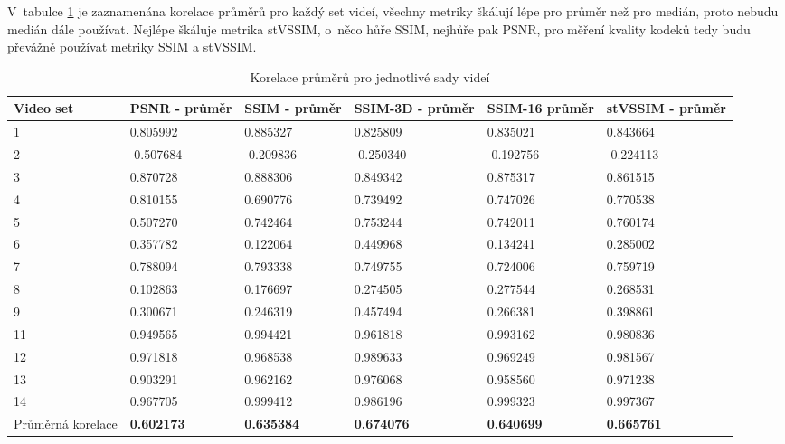 \documentclass[thesis=M,czech]{FITthesis}[2016/06/26]
\begin{document}
V~tabulce \ref{tab:korelace_avg} je zaznamenána korelace průměrů pro každý set videí, všechny metriky škálují lépe pro průměr než pro medián, proto nebudu medián dále používat. Nejlépe škáluje metrika stVSSIM, o~něco hůře SSIM, nejhůře pak PSNR, pro měření kvality kodeků tedy budu převážně používat metriky SSIM a stVSSIM.
\begin{table}[]
\centering
\begin{tabular}{|p{1.5cm}|p{1.8cm}|p{1.8cm}|p{1.9cm}|p{1.9cm}|p{1.9cm}|}
\hline
Video set         & PSNR - průměr & SSIM - průměr & SSIM-3D - průměr & SSIM-16 průměr & stVSSIM - průměr \\ \hline
1                 & 0.805992      & 0.885327      & 0.825809         & 0.835021       & 0.843664         \\ \hline
2                 & -0.507684     & -0.209836     & -0.250340        & -0.192756      & -0.224113        \\ \hline
3                 & 0.870728      & 0.888306      & 0.849342         & 0.875317       & 0.861515         \\ \hline
4                 & 0.810155      & 0.690776      & 0.739492         & 0.747026       & 0.770538         \\ \hline
5                 & 0.507270      & 0.742464      & 0.753244         & 0.742011       & 0.760174         \\ \hline
6                 & 0.357782      & 0.122064      & 0.449968         & 0.134241       & 0.285002         \\ \hline
7                 & 0.788094      & 0.793338      & 0.749755         & 0.724006       & 0.759719         \\ \hline
8                 & 0.102863      & 0.176697      & 0.274505         & 0.277544       & 0.268531         \\ \hline
9                 & 0.300671      & 0.246319      & 0.457494         & 0.266381       & 0.398861         \\ \hline
11                & 0.949565      & 0.994421      & 0.961818         & 0.993162       & 0.980836         \\ \hline
12                & 0.971818      & 0.968538      & 0.989633         & 0.969249       & 0.981567         \\ \hline
13                & 0.903291      & 0.962162      & 0.976068         & 0.958560       & 0.971238         \\ \hline
14                & 0.967705      & 0.999412      & 0.986196         & 0.999323       & 0.997367         \\ \hline
Průměrná korelace & \textbf{0.602173}      & \textbf{0.635384}      & \textbf{0.674076}         & \textbf{0.640699}       & \textbf{0.665761}         \\ \hline
\end{tabular}
\caption{Korelace průměrů pro jednotlivé sady videí} \label{tab:korelace_avg}
\end{table}
\end{document}
